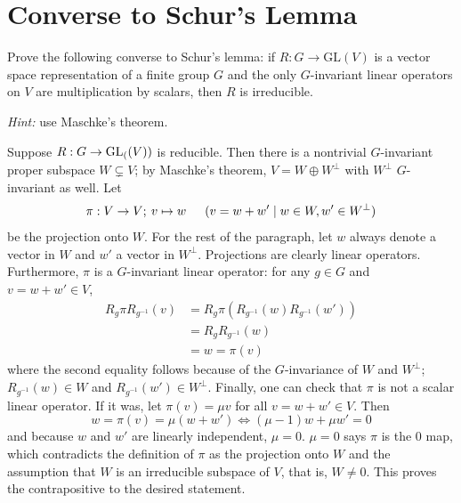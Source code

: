 \documentclass[12pt]{article}
\begin{document}
\section{Converse to Schur's Lemma}

Prove the following converse to Schur's lemma: if $R \colon G \to \mathrm{GL}(V)$
is a vector space representation of a finite group $G$ and the only
$G$-invariant linear operators on $V$ are multiplication by scalars, then $R$
is irreducible.

\emph{Hint:} use Maschke's theorem.

\noindent\dotfill

Suppose $R: G \rightarrow \text{GL}_{(}(V))$ is reducible. 
Then there is a nontrivial $G$-invariant proper subspace $W \subsetneq V$; 
by Maschke's theorem, $V = W \oplus W^{\perp}$ with $W^{\perp}$ $G$-invariant as well. 
Let 
$$\pi: V \rightarrow V; \: v \mapsto w\hspace{1.5em} (v = w + w' \mid w \in W, w' \in W^{\perp})$$
be the projection onto $W$. 
For the rest of the paragraph, let $w$ always denote a vector in $W$ and $w'$ a vector in $W^{\perp}$. 
Projections are clearly linear operators. 
Furthermore, $\pi$ is a $G$-invariant linear operator: 
for any $g \in G$ and $v = w + w' \in V$, 
\begin{align*}
  R_{g} \pi R_{g^{-1}}(v) & = R_{g} \pi(R_{g^{-1}}(w) R_{g^{-1}}(w')) \\ 
                          & = R_{g} R_{g^{-1}}(w) \\ 
                          & = w = \pi(v)
\end{align*}
where the second equality follows because of the $G$-invariance of $W$ and $W^{\perp}$; 
$R_{g^{-1}}(w) \in W$ and $R_{g^{-1}}(w') \in W^{\perp}$. 
Finally, one can check that $\pi$ is not a scalar linear operator. 
If it was, let $\pi(v) = \mu v$ for all $v = w + w' \in V$. 
Then 
$$w = \pi(v) = \mu(w + w') \iff (\mu - 1)w + \mu w' = 0$$ 
and because $w$ and $w'$ are linearly independent, $\mu = 0$. 
$\mu = 0$ says $\pi$ is the 0 map, which contradicts the definition of $\pi$ as the projection onto $W$ and the assumption that $W$ is an irreducible subspace of $V$, that is, $W \neq 0$. 
This proves the contrapositive to the desired statement. 
\end{document}
